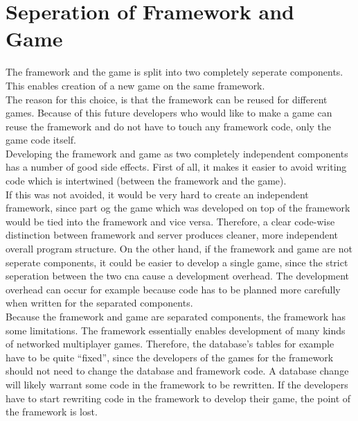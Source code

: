 \section{Seperation of Framework and Game}
The framework and the game is split into two completely seperate components. This enables creation of a new game on the same framework.\\

The reason for this choice, is that the framework can be reused for different games. Because of this future developers who would like to make a game can reuse the framework and do not have to touch any framework code, only the game code itself.\\
Developing the framework and game as two completely independent components has a number of good side effects. First of all, it makes it easier to avoid writing code which is intertwined (between the framework and the game).\\

If this was not avoided, it would be very hard to create an independent framework, since part og the game which was developed on top of the framework would be tied into the framework and vice versa. Therefore, a clear code-wise distinction between framework and server produces cleaner, more independent overall program structure. On the other hand, if the framework and game are not seperate components, it could be easier to develop a single game, since the strict seperation between the two cna cause a development overhead. The development overhead can occur for example because code has to be planned more carefully when written for the separated components.\\

Because the framework and game are separated components, the framework has some limitations. The framework essentially enables development of many kinds of networked multiplayer games. Therefore, the database's tables for example have to be quite ``fixed'', since the developers of the games for the framework should not need to change the database and framework code. A database change will likely warrant some code in the framework to be rewritten. If the developers have to start rewriting code in the framework to develop their game, the point of the framework is lost. 